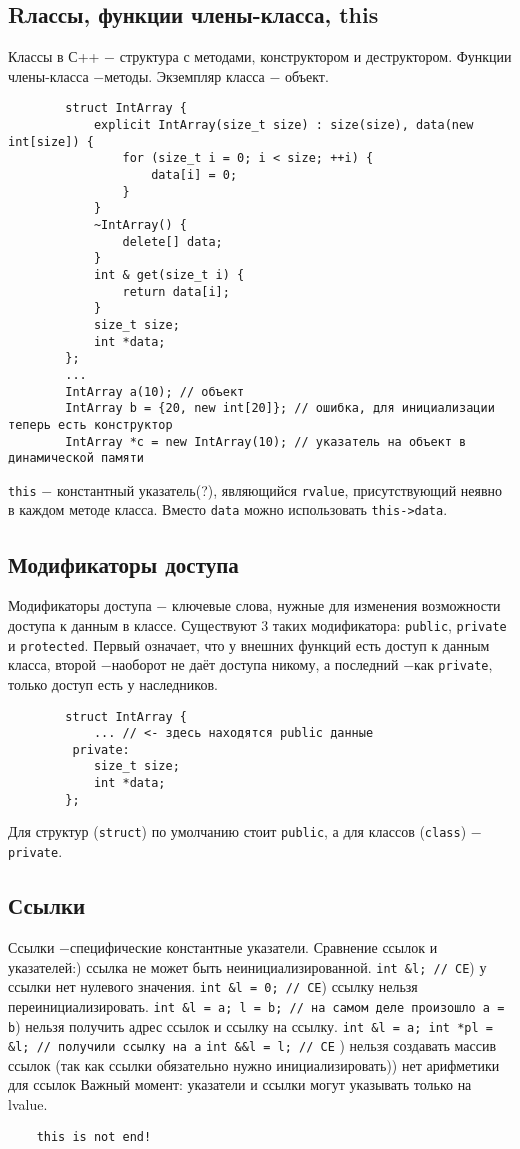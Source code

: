 \documentclass[15pt, a4paper]{article}
\newcommand{\nl}{\newline}
\begin{document}
\subsection{Rлассы, функции члены-класса, this}
    Классы в С++ $-$ структура с методами, конструктором и деструктором.\nl
    Функции члены-класса $-$методы.\nl
    Экземпляр класса $-$ объект.\nl
    \begin{verbatim}
        struct IntArray {
            explicit IntArray(size_t size) : size(size), data(new int[size]) {
                for (size_t i = 0; i < size; ++i) {
                    data[i] = 0;
                }
            }
            ~IntArray() {
                delete[] data;
            }
            int & get(size_t i) {
                return data[i];
            }
            size_t size;
            int *data;
        };
        ...
        IntArray a(10); // объект
        IntArray b = {20, new int[20]}; // ошибка, для инициализации теперь есть конструктор
        IntArray *c = new IntArray(10); // указатель на объект в динамической памяти
    \end{verbatim}
    \texttt{this} $-$ константный указатель(?), являющийся \texttt{rvalue}, присутствующий неявно в каждом
    методе класса. Вместо \texttt{data} можно использовать \texttt{this->data}.
  \subsection{Модификаторы доступа}
    Модификаторы доступа $-$ ключевые слова, нужные для изменения возможности доступа к данным в классе.
    \nl
    Существуют 3 таких модификатора: \texttt{public}, \texttt{private} и \texttt{protected}. Первый означает, что у
    внешних функций есть доступ к данным класса, второй $-$наоборот не даёт доступа никому, а последний $-$как
    \texttt{private}, только доступ есть у наследников.\nl
    \begin{verbatim}
        struct IntArray {
            ... // <- здесь находятся public данные
         private:
            size_t size;
            int *data;
        };
    \end{verbatim}
    Для структур (\texttt{struct}) по умолчанию стоит \texttt{public}, а для классов (\texttt{class}) $-$\texttt{private}.
  \subsection{Ссылки}
  Ссылки $-$специфические константные указатели.\nl
  Сравнение ссылок и указателей:\nl
  1) ссылка не может быть неинициализированной. \nl \texttt{int \&l; // CE}\nl
  2) у ссылки нет нулевого значения. \nl \texttt{int \&l = 0; // CE}\nl
  3) ссылку нельзя переинициализировать. \nl \texttt{int \&l = a; l = b; // на самом деле произошло a = b}\nl
  4) нельзя получить адрес ссылок и ссылку на ссылку. \nl \texttt {int \&l = a; int *pl = \&l; // получили ссылку на a} 
  \nl \texttt{int \&\&l = l; // CE} \nl
  5) нельзя создавать массив ссылок (так как ссылки обязательно нужно инициализировать)\nl
  6) нет арифметики для ссылок\nl
  Важный момент: указатели и ссылки могут указывать только на lvalue.\nl
  \begin{verbatim}
    this is not end!
  \end{verbatim}
\end{document}

